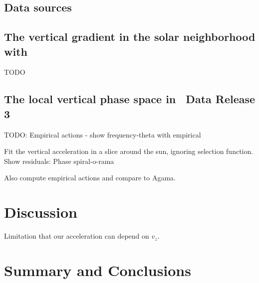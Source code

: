 \subsection{Data sources} \label{sec:data}



\subsection{The vertical  gradient in the solar neighborhood with \apogee}
\label{sec:apogee}

TODO


\subsection{The local vertical phase space in \gaia\ Data Release 3}
\label{sec:gaiadr3}

TODO: Empirical actions - show frequency-theta with empirical

Fit the vertical acceleration in a slice around the sun, ignoring selection function.
Show residuals: Phase spiral-o-rama

Also compute empirical actions and compare to Agama.


\section{Discussion} \label{sec:discussion}

Limitation that our acceleration can depend on $v_z$.




\section{Summary and Conclusions} \label{sec:conclusions}



